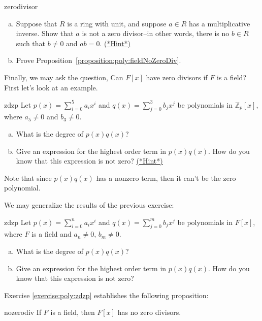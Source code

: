 \begin{exercise}{zerodivisor}
\begin{enumerate}[(a)]
\item
Suppose that $R$ is a ring with unit, and suppose $a \in R$ has a multiplicative inverse. Show that $a$ is not a zero divisor--in other words, there is no $b \in R$ such that $b\neq 0$ and $a   b = 0$.
\hyperref[sec:polyrings:hints]{(*Hint*)} 
\item
Prove Proposition~\ref{proposition:poly:fieldNoZeroDiv}.
\end{enumerate}
\end{exercise}

Finally, we may ask the question, Can $F[x]$ have zero divisors if $F$ is a field? First let's look at an example.

\begin{exercise}{zdzp}
Let $p(x)=\sum_{i=0}^{5} a_ix^i$ and $q(x)=\sum_{j=0}^{3} b_jx^j$ be polynomials in $\mathbb{Z}_p[x]$, where $a_5\neq 0$ and $b_3\neq 0$.
\begin{enumerate}[(a)]
\item
What is the degree of $p(x)q(x)$?
\item
Give an expression for the highest order term in $p(x)q(x)$. How do you know that this expression is not zero? \hyperref[sec:polyrings:hints]{(*Hint*)} 
\end{enumerate}
Note that since $p(x)q(x)$ has a nonzero term, then it can't be the zero polynomial.
\end{exercise}

\noindent
We may generalize the results of the previous exercise:

\begin{exercise}{zdzp}
Let $p(x)=\sum_{i=0}^{n} a_ix^i$ and $q(x)=\sum_{j=0}^{m} b_jx^j$ be polynomials in $F[x]$, where $F$ is a field and $a_n\neq 0$, $b_m\neq 0$.
\begin{enumerate}[(a)]
\item
What is the degree of $p(x)q(x)$?
\item
Give an expression for the highest order term in $p(x)q(x)$. How do you know that this expression is not zero? 
\end{enumerate}
\end{exercise}

Exercise \ref{exercise:poly:zdzp} establishes the following proposition: 

\begin{prop}{nozerodiv} If $F$ is a field, then $F[x]$ has no zero divisors.
\end{prop}

